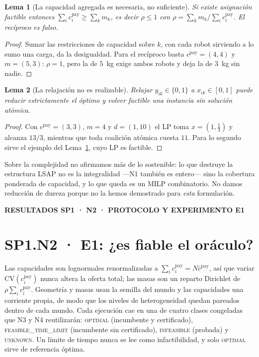 \documentclass[12pt,a4paper]{article}
\newcommand{\leveltag}[1]{%
  \noindent\colorbox{VIUDark}{%
    \parbox{\dimexpr\textwidth-2\fboxsep\relax}{%
      \color{white}\sffamily\bfseries\small #1%
    }%
  }\par\smallskip
}
\newtheorem{n1lema}{Lema}
\begin{document}
\begin{n1lema}[La capacidad agregada es necesaria, no suficiente]
\label{lema:n2-partition}
Si existe asignación factible entonces
$\sum_i c_i^{\mathrm{pay}}\geq\sum_k m_k$, es decir $\rho\leq1$ con
$\rho=\sum_km_k/\sum_ic_i^{\mathrm{pay}}$. El recíproco es falso.
\end{n1lema}

{\small
\begin{proof}
Sumar las restricciones de capacidad sobre $k$, con cada robot sirviendo a lo
sumo una carga, da la desigualdad. Para el recíproco basta
$c^{\mathrm{pay}}=(4,4)$ y $m=(5,3)$: $\rho=1$, pero la de $5$~kg exige
ambos robots y deja la de $3$~kg sin nadie.
\end{proof}
}

\begin{n1lema}[La relajación no es realizable]
\label{lema:n2-atomicity}
Relajar $y_{ik}\in\{0,1\}$ a $x_{ik}\in[0,1]$ puede reducir estrictamente el
óptimo y volver factible una instancia sin solución atómica.
\end{n1lema}

{\small
\begin{proof}
Con $c^{\mathrm{pay}}=(3,3)$, $m=4$ y $d=(1,10)$ el LP toma $x=(1,\tfrac13)$ y
alcanza $13/3$, mientras que toda coalición atómica cuesta $11$. Para lo segundo
sirve el ejemplo del Lema~\ref{lema:n2-partition}, cuyo LP es factible.
\end{proof}
}

Sobre la complejidad no afirmamos más de lo sostenible: lo que destruye la
estructura LSAP no es la integralidad —N1 también es entero— sino la cobertura
ponderada de capacidad, y lo que queda es un MILP combinatorio. No damos
reducción de dureza porque no la hemos demostrado para \emph{esta} formulación.

\clearpage

\leveltag{RESULTADOS SP1 · N2 · PROTOCOLO Y EXPERIMENTO E1}
\section*{SP1.N2 · E1: ¿es fiable el oráculo?}

Las capacidades son lognormales renormalizadas a
$\sum_ic_i^{\mathrm{pay}}=N\bar c^{\mathrm{pay}}$, así que variar
$\mathrm{CV}(c_i^{\mathrm{pay}})$ nunca altera la oferta total; las masas son un
reparto Dirichlet de $\rho\sum_ic_i^{\mathrm{pay}}$. Geometría y masas usan la
semilla del mundo y las capacidades una corriente propia, de modo que los
niveles de heterogeneidad quedan pareados dentro de cada mundo. Cada ejecución
cae en una de cuatro clases congeladas que N3 y N4 reutilizarán:
\textsc{optimal} (incumbente y certificado), \textsc{feasible\_time\_limit}
(incumbente sin certificado), \textsc{infeasible} (probada) y \textsc{unknown}.
Un límite de tiempo nunca se lee como infactibilidad, y solo \textsc{optimal}
sirve de referencia óptima.
\end{document}
